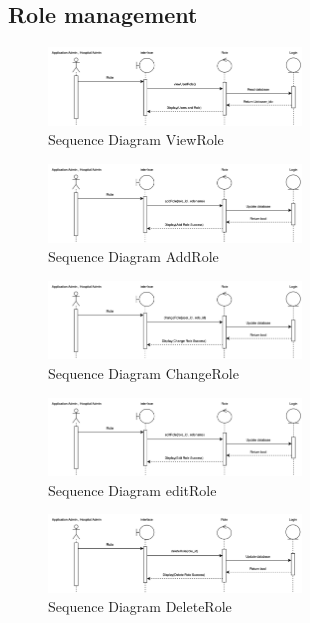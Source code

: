 \subsection{Role management}

\begin{figure}[h]
    \centering
    \includegraphics[width=0.6\textwidth]{Sequence 8.1.png}
    \caption{Sequence Diagram ViewRole}
    \end{figure}

    \begin{figure}[h]
    \centering
    \includegraphics[width=0.6\textwidth]{Sequence 8.2.png}
    \caption{Sequence Diagram AddRole}
    \end{figure}

    \begin{figure}[h]
    \centering
    \includegraphics[width=0.6\textwidth]{Sequence 8.3.png}
    \caption{Sequence Diagram ChangeRole}
    \end{figure}

    \begin{figure}[h]
    \centering
    \includegraphics[width=0.6\textwidth]{Sequence 8.4.png}
    \caption{Sequence Diagram editRole}
    \end{figure}

    \begin{figure}[h]
    \centering
    \includegraphics[width=0.6\textwidth]{Sequence 8.5.png}
    \caption{Sequence Diagram DeleteRole}
    \end{figure}

